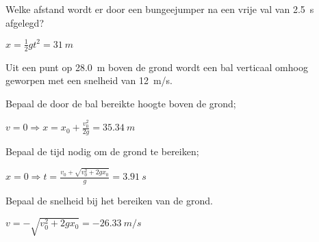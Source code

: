 \documentclass{ximera}
\begin{document}
	\author{Bart Lambregs}
    \xmsource\xmuitleg

\begin{exercise}
    Welke afstand wordt er door een bungeejumper na een vrije val van \SI{2,5}{s} afgelegd?
    \begin{oplossing}
        $x=\frac{1}{2}gt^2=\SI{31}{m}$
    \end{oplossing}
\end{exercise}

\begin{exercise}
    Uit een punt op \SI{28,0}{m} boven de grond wordt een bal verticaal omhoog geworpen met een snelheid van \SI{12}{m/s}. 
    \begin{question} Bepaal de door de bal bereikte hoogte boven de grond; \begin{oplossing} $v=0\Rightarrow x=x_0+\frac{v_0^2}{2g}=\SI{35,34}{m}$ \end{oplossing} \end{question}
    \begin{question} Bepaal de tijd nodig om de grond te bereiken;              \begin{oplossing} $x=0\Rightarrow t=\frac{v_0+\sqrt{v_0^2+2gx_0}}{g}=\SI{3,91}{s}$\end{oplossing} \end{question}
    \begin{question} Bepaal de snelheid bij het bereiken van de grond.          \begin{oplossing} $v=-\sqrt{v_0^2+2gx_0}=\SI{-26,33}{m/s}$ \end{oplossing} \end{question}
\end{exercise}
\end{document}
